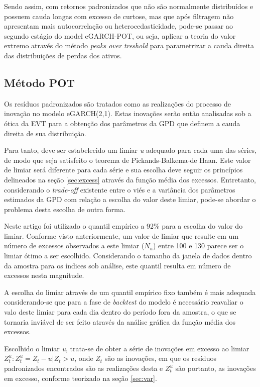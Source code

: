 \documentclass[review]{elsarticle}
\theoremstyle{definition}
\begin{document}
Sendo assim, com retornos padronizados que não são normalmente distribuídos e possuem cauda longas com excesso de curtose, mas que após filtragem não apresentam mais autocorrelação ou heterocedasticidade, pode-se passar ao segundo estágio do model eGARCH-POT, ou seja, aplicar a teoria do valor extremo através do método \emph{peaks over treshold} para parametrizar a cauda direita das distribuições de perdas dos ativos.

\subsection{Método POT}
\label{sec:metpot}

Os resíduos padronizados são tratados como as realizações do processo de inovação no modelo eGARCH(2,1). Estas inovações serão então analisadas sob a ótica da EVT para a obtenção dos parâmetros da GPD que definem a cauda direita de sua distribuição.

Para tanto, deve ser estabelecido um limiar \emph{u} adequado para cada uma das séries, de modo que seja satisfeito o teorema de Pickands-Balkema-de Haan. Este valor de limiar será diferente para cada série e sua escolha deve seguir os princípios delineados na seção \ref{sec:excess} através da função média dos excessos. Entretanto, considerando o \emph{trade-off} existente entre o viés e a variância dos parâmetros estimados da GPD com relação a escolha do valor deste limiar, pode-se abordar o problema desta escolha de outra forma.

Neste artigo foi utilizado o quantil empírico a 92\% para a escolha do valor do limiar. Conforme visto anteriormente, um valor de limiar que resulte em um número de excessos observados a este limiar ($N_u$) entre 100 e 130 parece ser o limiar ótimo a ser escolhido. Considerando o tamanho da janela de dados dentro da amostra para os índices sob análise, este quantil resulta em número de excessos nesta magnitude.

A escolha do limiar através de um quantil empírico fixo também é mais adequada considerando-se que para a fase de \emph{backtest} do modelo é necessário reavaliar o valo deste limiar para cada dia dentro do período fora da amostra, o que se tornaria inviável de ser feito através da análise gráfica da função média dos excessos.

Escolhido o limiar \emph{u}, trata-se de obter a série de inovações em excesso ao limiar $Z^u_t:{Z^u_t = Z_t-u |Z_t > u}$, onde $Z_t$ são as inovações, em que os resíduos padronizados encontrados são as realizações desta e $Z^u_t$ são portanto, as inovações em excesso, conforme teorizado na seção \ref{sec:var}.
\end{document}
